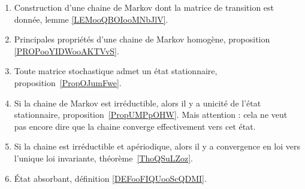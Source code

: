

\begin{enumerate}
    \item
        Construction d'une chaine de Markov dont la matrice de transition est donnée, lemme \ref{LEMooQBOIooMNbJlV}.
    \item
        Principales propriétés d'une chaine de Markov homogène, proposition \ref{PROPooYIDWooAKTVvS}.
	\item
	      Toute matrice stochastique admet un état stationnaire, proposition~\ref{PropOJumFwe}.
	\item
	      Si la chaine de Markov est irréductible, alors il y a unicité de l'état stationnaire, proposition~\ref{PropUMPpOHW}. Mais attention : cela ne veut pas encore dire que la chaine converge effectivement vers cet état.
	\item
	      Si la chaine est irréductible et apériodique, alors il y a convergence en loi vers l'unique loi invariante, théorème~\ref{ThoQSuLZoz}.
      \item
          État absorbant, définition \ref{DEFooFIQUooScQDMI}.
\end{enumerate}
